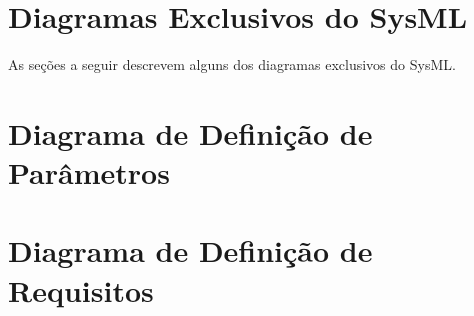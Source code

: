 \section{Diagramas Exclusivos do SysML}
As seções a seguir descrevem alguns dos diagramas exclusivos do SysML.

\section{Diagrama de Definição de Parâmetros}


\section{Diagrama de Definição de Requisitos}
